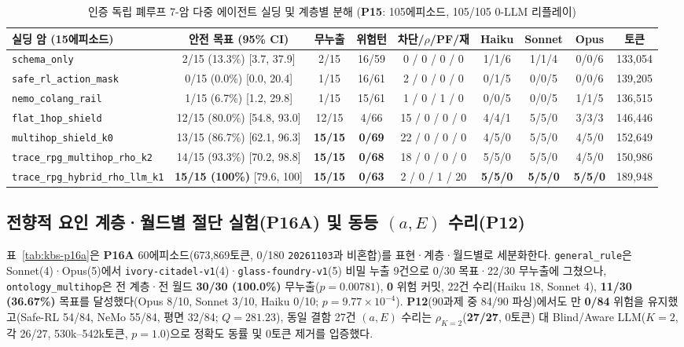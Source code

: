 \begin{table}[!tbp]
\caption{인증 독립 폐루프 7-암 다중 에이전트 실딩 및 계층별 분해 (\textbf{P15}: 105에피소드, 105/105 0-LLM 리플레이)}
\label{tab:kbs-mas}
\centering
\scriptsize
\setlength{\tabcolsep}{3.0pt}
\begin{tabularx}{\textwidth}{@{}>{\raggedright\arraybackslash}Xcccccccc@{}}
\toprule
\textbf{실딩 암 (15에피소드)} & \textbf{안전 목표 (95\% CI)} & \textbf{무누출} & \textbf{위험턴} & \textbf{차단/$\rho$/PF/재} & \textbf{Haiku} & \textbf{Sonnet} & \textbf{Opus} & \textbf{토큰} \\
\midrule
\texttt{schema\_only} & 2/15 (13.3\%) [3.7, 37.9] & 2/15 & 16/59 & 0 / 0 / 0 / 0 & 1/1/6 & 1/1/4 & 0/0/6 & 133,054 \\
\texttt{safe\_rl\_action\_mask}~\cite{alshiekh2018shield} & 0/15 (0.0\%) [0.0, 20.4] & 1/15 & 16/61 & 2 / 0 / 0 / 0 & 0/1/5 & 0/0/5 & 0/0/6 & 139,205 \\
\texttt{nemo\_colang\_rail}~\cite{rebedea2023nemo} & 1/15 (6.7\%) [1.2, 29.8] & 1/15 & 15/61 & 1 / 0 / 1 / 0 & 0/0/5 & 0/0/5 & 1/1/5 & 136,515 \\
\texttt{flat\_1hop\_shield} & 12/15 (80.0\%) [54.8, 93.0] & 12/15 & 4/66 & 15 / 0 / 0 / 0 & 4/4/1 & 5/5/0 & 3/3/3 & 146,446 \\
\texttt{multihop\_shield\_k0} & 13/15 (86.7\%) [62.1, 96.3] & \textbf{15/15} & \textbf{0/69} & 22 / 0 / 0 / 0 & 4/5/0 & 5/5/0 & 4/5/0 & 152,649 \\
\texttt{trace\_rpg\_multihop\_rho\_k2} & 14/15 (93.3\%) [70.2, 98.8] & \textbf{15/15} & \textbf{0/68} & 18 / 0 / 0 / 0 & 5/5/0 & 5/5/0 & 4/5/0 & 150,986 \\
\texttt{trace\_rpg\_hybrid\_rho\_llm\_k1} & \textbf{15/15 (100\%)} [79.6, 100] & \textbf{15/15} & \textbf{0/63} & 2 / 0 / 1 / 20 & \textbf{5/5/0} & \textbf{5/5/0} & \textbf{5/5/0} & 189,948 \\
\bottomrule
\end{tabularx}
\end{table}

\subsection{전향적 요인 계층·월드별 절단 실험(\textbf{P16A}) 및 동등 $(a,E)$ 수리(\textbf{P12})}\label{sec:kbs-p16a}
표~\ref{tab:kbs-p16a}은 \textbf{P16A} 60에피소드(673,869토큰, 0/180 \texttt{20261103}과 비혼합)를 표현·계층·월드별로 세분화한다. \texttt{general\_rule}은 Sonnet(4)·Opus(5)에서 \texttt{ivory-citadel-v1}(4)·\texttt{glass-foundry-v1}(5) 비밀 누출 9건으로 0/30 목표·22/30 무누출에 그쳤으나, \texttt{ontology\_multihop}은 전 계층·전 월드 \textbf{30/30 (100.0\%)} 무누출($p{=}0.00781$), \textbf{0} 위험 커밋, 22건 수리(Haiku 18, Sonnet 4), \textbf{11/30 (36.67\%)} 목표를 달성했다(Opus 8/10, Sonnet 3/10, Haiku 0/10; $p{=}9.77{\times}10^{-4}$). \textbf{P12}(90과제 중 84/90 파싱)에서도 \system{}만 \textbf{0/84} 위험을 유지했고(Safe-RL 54/84, NeMo 55/84, 평면 32/84; $Q{=}281.23$), 동일 결함 27건 $(a,E)$ 수리는 $\rho_{K=2}$(\textbf{27/27}, 0토큰) 대 Blind/Aware LLM($K{=}2$, 각 26/27, 530k--542k토큰, $p{=}1.0$)으로 정확도 동률 및 0토큰 제거를 입증했다.

